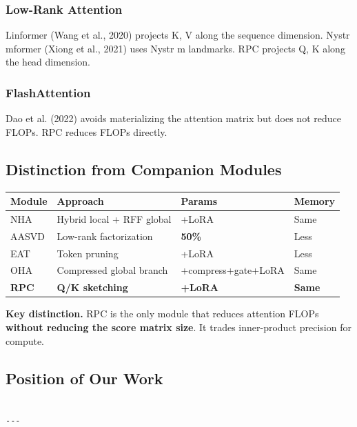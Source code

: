 \subsubsection{Low-Rank Attention}

Linformer (Wang et al., 2020) projects K, V along the sequence dimension. 
Nystr mformer (Xiong et al., 2021) uses Nystr m landmarks. RPC projects 
Q, K along the head dimension.

\subsubsection{FlashAttention}

Dao et al. (2022) avoids materializing the attention matrix but does not 
reduce FLOPs. RPC reduces FLOPs directly.

\subsection{Distinction from Companion Modules}

\begin{table}[H]
\centering
\small
\begin{tabular}{llll}
\toprule
\textbf{Module} & \textbf{Approach} & \textbf{Params} & \textbf{Memory} \\
\midrule
NHA & Hybrid local + RFF global & +LoRA & Same \\
AASVD & Low-rank factorization & \textbf{ 50\%} & Less \\
EAT & Token pruning & +LoRA & Less \\
OHA & Compressed global branch & +compress+gate+LoRA & Same \\
\textbf{RPC} & \textbf{Q/K sketching} & \textbf{+LoRA} & \textbf{Same} \\
\bottomrule
\end{tabular}
\end{table}

\textbf{Key distinction.} RPC is the only module that reduces attention FLOPs 
\textbf{without reducing the score matrix size}. It trades inner-product 
precision for compute.

\subsection{Position of Our Work}

\begin{lstlisting}

---
\end{lstlisting}

